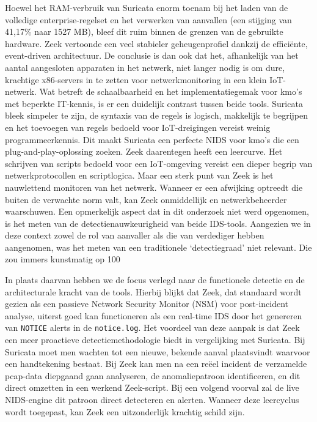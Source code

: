 Hoewel het RAM-verbruik van Suricata enorm toenam bij het laden van de volledige enterprise-regelset en het verwerken van aanvallen (een stijging van 41,17\% naar 1527 MB), bleef dit ruim binnen de grenzen van de gebruikte hardware. Zeek vertoonde een veel stabieler geheugenprofiel dankzij de efficiënte, event-driven architectuur. De conclusie is dan ook dat het, afhankelijk van het aantal aangesloten apparaten in het netwerk, niet langer nodig is om dure, krachtige x86-servers in te zetten voor netwerkmonitoring in een klein IoT-netwerk.
Wat betreft de schaalbaarheid en het implementatiegemak voor kmo's met beperkte IT-kennis, is er een duidelijk contrast tussen beide tools. Suricata bleek simpeler te zijn, de syntaxis van de regels is logisch, makkelijk te begrijpen en het toevoegen van regels bedoeld voor IoT-dreigingen vereist weinig programmeerkennis. Dit maakt Suricata een perfecte NIDS voor kmo’s die een plug-and-play-oplossing zoeken.  Zeek daarentegen heeft een leercurve. Het schrijven van scripts bedoeld voor een IoT-omgeving vereist een dieper begrip van netwerkprotocollen en scriptlogica. Maar een sterk punt van Zeek is het nauwlettend monitoren van het netwerk. Wanneer er een afwijking optreedt die buiten de verwachte norm valt, kan Zeek onmiddellijk en netwerkbeheerder waarschuwen.
Een opmerkelijk aspect dat in dit onderzoek niet werd opgenomen, is het meten van de detectienauwkeurigheid van beide IDS-tools. Aangezien we in deze context zowel de rol van aanvaller als die van verdediger hebben aangenomen, was het meten van een traditionele ‘detectiegraad’ niet relevant. Die zou immers kunstmatig op 100%

In plaats daarvan hebben we de focus verlegd naar de functionele detectie en de architecturale kracht van de tools. Hierbij blijkt dat Zeek, dat standaard wordt gezien als een passieve Network Security Monitor (NSM) voor post-incident analyse, uiterst goed kan functioneren als een real-time IDS door het genereren van \texttt{NOTICE} alerts in de \texttt{notice.log}. Het voordeel van deze aanpak is dat Zeek een meer proactieve detectiemethodologie biedt in vergelijking met Suricata. Bij Suricata moet men wachten tot een nieuwe, bekende aanval plaatsvindt waarvoor een handtekening bestaat. Bij Zeek kan men na een reëel incident de verzamelde pcap-data diepgaand gaan analyseren, de anomaliepatroon identificeren, en dit direct omzetten in een werkend Zeek-script. Bij een volgend voorval zal de live NIDS-engine dit patroon direct detecteren en alerten. 
Wanneer deze leercyclus wordt toegepast, kan Zeek een uitzonderlijk krachtig schild zijn.


